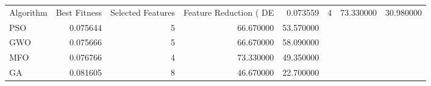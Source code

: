 \begin{tabular}{lrrrr}
\toprule
Algorithm & Best Fitness & Selected Features & Feature Reduction (%
\midrule
DE & 0.073559 & 4 & 73.330000 & 30.980000 \\
PSO & 0.075644 & 5 & 66.670000 & 53.570000 \\
GWO & 0.075666 & 5 & 66.670000 & 58.090000 \\
MFO & 0.076766 & 4 & 73.330000 & 49.350000 \\
GA & 0.081605 & 8 & 46.670000 & 22.700000 \\
\bottomrule
\end{tabular}
